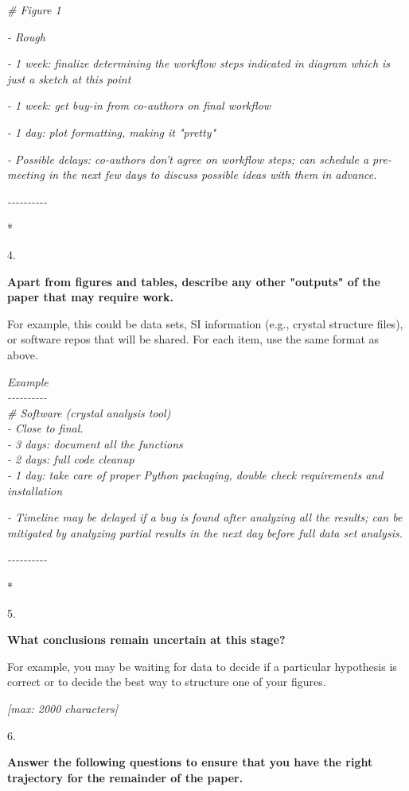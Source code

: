 \documentclass[]{article}
\begin{document}
\emph{\# Figure 1}

\emph{- Rough}

\emph{- 1 week: finalize determining the workflow steps indicated in
diagram which is just a sketch at this point}

\emph{- 1 week: get buy-in from co-authors on final workflow}

\emph{- 1 day: plot formatting, making it "pretty"}

\emph{- Possible delays: co-authors don't agree on workflow steps; can
schedule a pre-meeting in the next few days to discuss possible ideas
with them in advance.}

\emph{-\/-\/-\/-\/-\/-\/-\/-\/-\/-}

*

4.

\textbf{Apart from figures and tables, describe any other "outputs" of
the paper that may require work.}

For example, this could be data sets, SI information (e.g., crystal
structure files), or software repos that will be shared. For each item,
use the same format as above.

\emph{Example\\
-\/-\/-\/-\/-\/-\/-\/-\/-\/-\\
\# Software (crystal analysis tool)\\
- Close to final.\\
- 3 days: document all the functions\\
- 2 days: full code cleanup\\
- 1 day: take care of proper Python packaging, double check requirements
and installation}

\emph{- Timeline may be delayed if a bug is found after analyzing all
the results; can be mitigated by analyzing partial results in the next
day before full data set analysis.}

\emph{-\/-\/-\/-\/-\/-\/-\/-\/-\/-}

*

5.

\textbf{What conclusions remain uncertain at this stage?}~

For example, you may be waiting for data to decide if a particular
hypothesis is correct or to decide the best way to structure one of your
figures.

\emph{{[}max: 2000 characters{]}}

6.

\textbf{Answer the following questions to ensure that you have the right
trajectory for the remainder of the paper.}
\end{document}
